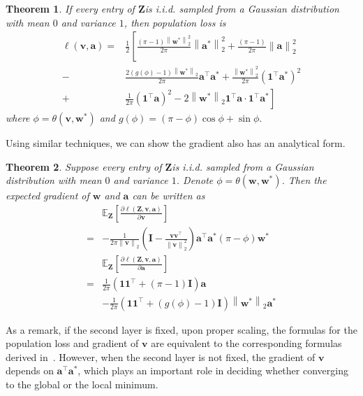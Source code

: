 \documentclass{article}
\newcommand{\firstlayer}{w}
\newcommand{\firstlayerWN}{v}
\newcommand{\secondlayer}{a}
\newcommand{\mat}[1]{\mathbf{#1}}
\newcommand{\vect}[1]{\mathbf{#1}}
\newcommand{\norm}[1]{\left\|#1\right\|}
\newcommand{\expect}{\mathbb{E}}
\newtheorem{thm}{Theorem}[section]
\begin{document}
\begin{thm}\label{thm:gaussian_input_obj_WN}
If every entry of $\mat{Z}$is  i.i.d. sampled from a Gaussian distribution with mean $0$ and variance $1$, then  population loss is
\begin{align}
\ell\left(\vect{\firstlayerWN},\vect{\secondlayer}\right)= & \frac{1}{2}\left[\frac{\left(\pi-1\right)\norm{\vect{w}^*}_2^2}{2\pi}\norm{\vect{\secondlayer}^*}_2^2 + \frac{\left(\pi-1\right)}{2\pi}\norm{\vect{\secondlayer}}_2^2 \right. \nonumber\\
- & \left.\frac{2\left(g\left(\phi\right)-1\right)\norm{\vect{\firstlayer}^*}_2}{2\pi} \vect{\secondlayer}^\top \vect{\secondlayer}^* +  \frac{\norm{\vect{\firstlayer}^*}_2^2}{2\pi} \left(\vect{1}^\top \vect{\secondlayer}^*\right)^2 \right. \nonumber\\
+ &\left. \frac{1}{2\pi}\left(\vect{1}^\top\vect{\secondlayer}\right)^2 - 2\norm{\vect{\firstlayer}^*}_2\vect{1}^\top\vect{\secondlayer}\cdot\vect{1}^\top\vect{\secondlayer}^*
\right]
\label{eqn:gaussian_input_obj_WN}
\end{align}
where $\phi = \theta\left(\vect{\firstlayerWN},\vect{\firstlayer}^*\right)$ and $g(\phi) = (\pi-\phi)\cos \phi+\sin\phi.$
\end{thm}Using similar techniques, we can show the gradient also has an analytical form.
\begin{thm}\label{thm:expected_gradient_WN}
Suppose every entry of $\mat{Z}$is  i.i.d. sampled from a Gaussian distribution with mean $0$ and variance $1$.
Denote $\phi=\theta\left(\vect{w},\vect{w}^*\right)$.
Then the expected gradient of $\vect{w}$ and $\vect{\secondlayer}$ can be written as \begin{align*}
&\expect_{\mat{Z}}\left[\frac{\partial \ell\left(\mat{Z},\vect{\firstlayerWN},\vect{\secondlayer}\right)}{\partial \vect{\firstlayerWN}}\right]\\  =
&-\frac{1}{2\pi\norm{\vect{\firstlayerWN}}_2}\left(\mat{I}-\frac{\vect{\firstlayerWN}\vect{\firstlayerWN}^\top}{\norm{\vect{\firstlayerWN}}_2^2}\right)\vect{\secondlayer}^\top \vect{\secondlayer}^*\left(\pi-\phi\right)\vect{w}^*\\
&\expect_{\mat{Z}}\left[\frac{\partial \ell\left(\mat{Z},\vect{\firstlayerWN},\vect{\secondlayer}\right)}{\partial \vect{\secondlayer}}\right] \\
= &\frac{1}{2\pi}\left(\vect{1}\vect{1}^\top + \left(\pi-1\right)\mat{I}\right)\vect{\secondlayer} \\
& -\frac{1}{2\pi}\left(\vect{1}\vect{1}^\top + \left(g(\phi)-1\right)\mat{I}\right)\norm{\vect{w}^*}_2\vect{\secondlayer}^*
\end{align*}
\end{thm}
As a remark, if the second layer is fixed, upon proper scaling, the formulas for the population loss and gradient of $\vect{\firstlayerWN}$ are equivalent to the corresponding formulas derived in~\citep{brutzkus2017globally,cho2009kernel}.
However, when the second layer is not fixed, the gradient of $\vect{\firstlayerWN}$ depends on $\vect{\secondlayer}^\top \vect{\secondlayer}^*$, which plays an important role in deciding whether converging to the global or the local minimum.
\end{document}
